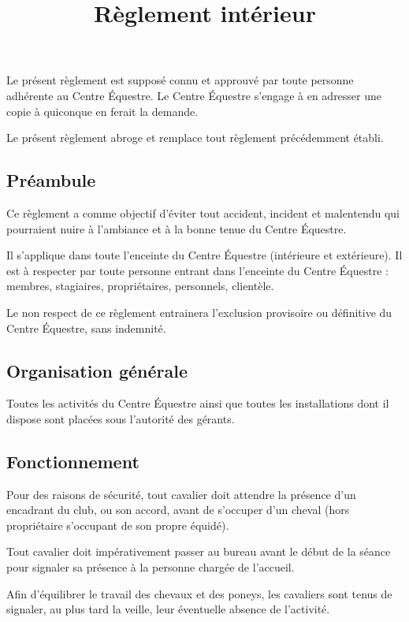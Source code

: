 \documentclass[11pt,a4paper]{article}
\title[Règlement intérieur -- version du \today]{Règlement intérieur}
\author{}
\date{}
\begin{document}
\maketitle


Le présent règlement est supposé connu et approuvé par toute personne adhérente au Centre Équestre. Le Centre Équestre s'engage à en adresser une copie à quiconque en ferait la demande.

Le présent règlement abroge et remplace tout règlement précédemment établi.

\subsection*{Préambule}

Ce règlement a comme objectif d'éviter tout accident, incident et malentendu qui pourraient nuire à l'ambiance et à la bonne tenue du Centre Équestre.

Il s'applique dans toute l'enceinte du Centre Équestre (intérieure et extérieure). Il est à respecter par toute personne entrant dans l'enceinte du Centre Équestre : membres, stagiaires, propriétaires, personnels, clientèle.

Le non respect de ce règlement entrainera l'exclusion provisoire ou définitive du Centre Équestre, sans indemnité.

\subsection{Organisation générale}
Toutes les activités du Centre Équestre ainsi que toutes les installations dont il dispose sont placées sous l'autorité des gérants.

\subsection{Fonctionnement}
Pour des raisons de sécurité, tout cavalier doit attendre la présence d'un encadrant du club, ou son accord, avant de s'occuper d'un cheval (hors propriétaire s'occupant de son propre équidé).

Tout cavalier doit impérativement passer au bureau avant le début de la séance pour signaler sa présence à la personne chargée de l'accueil.

Afin d'équilibrer le travail des chevaux et des poneys, les cavaliers sont tenus de signaler, au plus tard la veille, leur éventuelle absence de l'activité.
\end{document}
